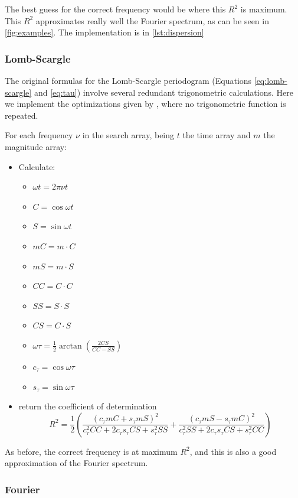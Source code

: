 The best guess for the correct frequency would be where this $R^2$ is maximum.
This $R^2$ approximates really well the Fourier spectrum, as can be seen in \autoref{fig:examples}.
The implementation is in \autoref{lst:dispersion}

\subsubsection{Lomb-Scargle}


The original formulas for the Lomb-Scargle periodogram (Equations \ref{eq:lomb-scargle} and \ref{eq:tau}) 
involve several redundant trigonometric calculations.
Here we implement the optimizations given by \cite{Townsend2010}, where no trigonometric function is repeated.

For each frequency $\nu$ in the search array, being $t$ the time array and $m$ the magnitude array:
\begin{itemize}
	\item Calculate:
	\begin{itemize}
		\item $\omega t = 2\pi\nu t$
		\item $C=\cos\omega t$
		\item $S=\sin\omega t$
		\item $mC= m \cdot C$
		\item $mS = m \cdot S$ 
		\item $CC=C\cdot C$
		\item $SS=S\cdot S$
		\item $CS=C \cdot S$
		\item $\omega\tau = \frac12 \arctan\left(\frac{2 CS}{CC-SS}\right)$
		\item $c_\tau = \cos\omega\tau$
		\item $s_\tau = \sin\omega\tau$
	\end{itemize}
	\item return the coefficient of determination
	$$
	R^2 = \frac12 \left(\frac{(c_\tau mC + s_\tau mS)^2}{c_\tau^2 CC + 2 c_\tau s_\tau CS + s_\tau^2 SS}
	+ \frac{(c_\tau mS-s_\tau mC)^2}{c_\tau^2 SS + 2 c_\tau s_\tau CS + s_\tau^2 CC}\right)
	$$
\end{itemize}

As before, the correct frequency is at maximum $R^2$, and this is also a good approximation of the Fourier spectrum.

\subsubsection{Fourier}

